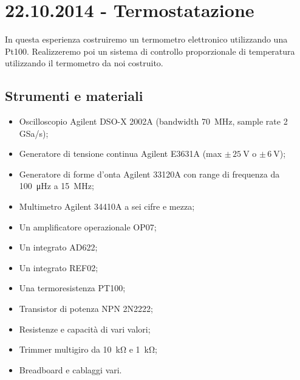 \section{22.10.2014 - Termostatazione}

In questa esperienza costruiremo un termometro elettronico utilizzando una Pt100. Realizzeremo poi un sistema di controllo proporzionale di temperatura utilizzando il termometro da noi costruito. 

\subsection*{Strumenti e materiali}

\begin{itemize} [noitemsep]
\item Oscilloscopio Agilent DSO-X 2002A (bandwidth \SI{70}{\mega\hertz}, sample rate \num{2} GSa/s);
\item Generatore di tensione continua Agilent E3631A (max $\pm \, \SI{25}{\volt}$ o $\pm \, \SI{6}{\volt}$);
\item Generatore di forme d'onta Agilent 33120A con range di frequenza da \SI{100}{\micro\hertz} a \SI{15}{\mega\hertz};
\item Multimetro Agilent 34410A a sei cifre e mezza;
\item Un amplificatore operazionale OP07;
\item Un integrato AD622;
\item Un integrato REF02;
\item Una termoresistenza PT100;
\item Transistor di potenza NPN 2N2222;
\item Resistenze e capacità di vari valori;
\item Trimmer multigiro da \SI{10}{\kilo\ohm} e \SI{1}{\kilo\ohm};
\item Breadboard e cablaggi vari.
\end{itemize}
